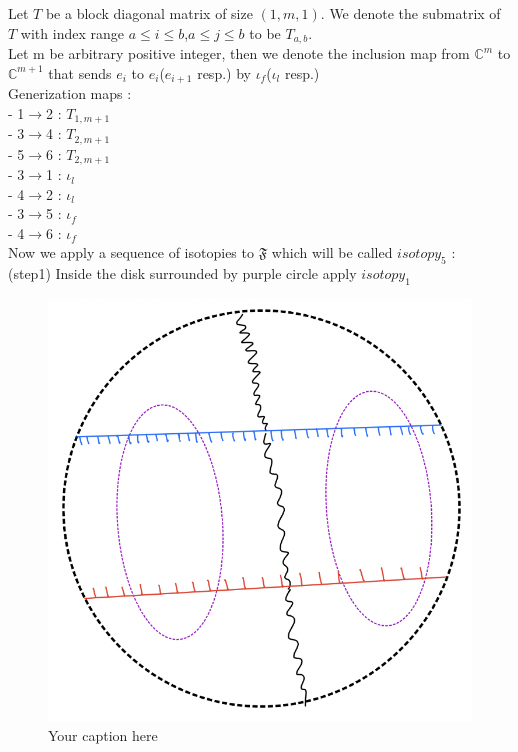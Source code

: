 Let $T$ be a block diagonal matrix of size $(1,m,1)$. We denote the submatrix of $T$ with index range $a\leq i \leq b$,$a\leq j \leq b$ to be $T_{a,b}$. \\

Let m be arbitrary positive integer, then we denote the inclusion map from $\mathbb{C}^{m}$ to $\mathbb{C}^{m+1}$ that sends $e_i$ to $e_i$($e_{i+1}$ resp.) by $\iota_f$($\iota_l$ resp.)\\

Generization maps :\\

- 1$\rightarrow$2 : $T_{1,m+1}$\\
- 3$\rightarrow$4 : $T_{2,m+1}$\\
- 5$\rightarrow$6 : $T_{2,m+1}$\\
- 3$\rightarrow$1 : $\iota_l$\\
- 4$\rightarrow$2 : $\iota_l$\\
- 3$\rightarrow$5 : $\iota_f$\\
- 4$\rightarrow$6 : $\iota_f$\\

Now we apply a sequence of isotopies to $\mathfrak{F}$ which will be called $isotopy_5$ :\\

(step1) Inside the disk surrounded by purple circle apply $isotopy_1$

\begin{figure}[H] %
    \centering
    \includegraphics[width=\linewidth]{diagrams/lemma5/2.png} %
    \caption{Your caption here}
    \label{fig:your-label}
\end{figure}

